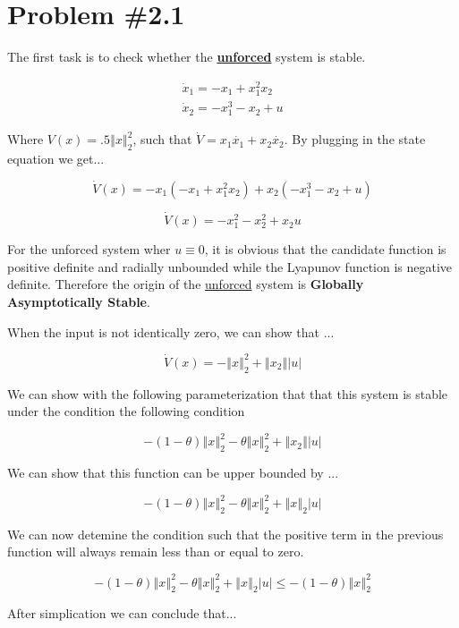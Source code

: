 \section*{Problem \#2.1}


The first task is to check whether the \textbf{\underline{unforced}} system is stable.

$$
\begin{array}{l}
\dot{x}_{1}=-x_{1} + x_{1}^{2} x_{2} \\
\dot{x}_{2}=-x_{1}^{3}-x_{2}+u
\end{array}
$$

\noindent Where $V(x) = .5 \left\Vert x \right\Vert^2_2$, such that $\dot{V} = x_1\dot{x_1} + x_2 \dot{x_2}$. By plugging in the state equation we get...

$$
\dot{V}(x) = -x_1(-x_1 + x_1^2x_2) + x_2 (-x_1^3 -x_2 + u)
$$

$$
\dot{V}(x) = -x_1^2 -x_2^2 + x_2u
$$

\noindent For the unforced system wher $u \equiv 0$, it is obvious that the candidate function is positive definite and radially unbounded while the Lyapunov function is negative definite. Therefore the origin of the \underline{unforced} system is \textbf{Globally Asymptotically Stable}.

\noindent When the input is not identically zero, we can show that ...

$$
\dot{V}(x) =  -\left\Vert x \right \Vert_2^2 + \left\Vert x_2\right\Vert|u|
$$

\noindent We can show  with the following parameterization that that this system is stable under the condition the following condition


$$
-(1-\theta)\left\Vert x \right \Vert_2^2 -\theta\left\Vert x \right \Vert_2^2 + \left\Vert x_2\right\Vert|u|
$$

\noindent We can show that this function can be upper bounded by ...

$$
-(1-\theta)\left\Vert x \right \Vert_2^2 -\theta\left\Vert x \right \Vert_2^2 + \left\Vert x \right\Vert_2|u|
$$

\noindent We can now detemine the condition such that the positive term in the previous function will always remain less than or equal to zero.

$$
-(1-\theta)\left\Vert x \right \Vert_2^2 -\theta\left\Vert x \right \Vert_2^2 + \left\Vert x \right\Vert_2|u| \leq -(1-\theta)\left\Vert x \right \Vert_2^2
$$


\noindent After simplication we can conclude that...


